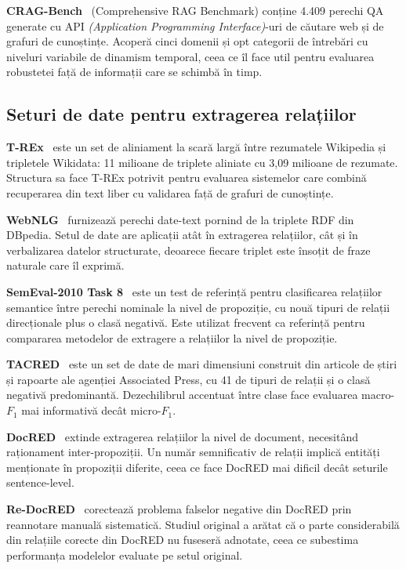 \textbf{CRAG-Bench}~\cite{yang2024cragbench} (Comprehensive RAG Benchmark) conține 4.409 perechi QA generate cu API \textit{(Application Programming Interface)}-uri de căutare web și de grafuri de cunoștințe. Acoperă cinci domenii și opt categorii de întrebări cu niveluri variabile de dinamism temporal, ceea ce îl face util pentru evaluarea robustetei față de informații care se schimbă în timp.

\subsection{Seturi de date pentru extragerea relațiilor}

\textbf{T-REx}~\cite{elsahar2018trex} este un set de aliniament la scară largă între rezumatele Wikipedia și tripletele Wikidata: 11 milioane de triplete aliniate cu 3,09 milioane de rezumate. Structura sa face T-REx potrivit pentru evaluarea sistemelor care combină recuperarea din text liber cu validarea față de grafuri de cunoștințe.

\textbf{WebNLG}~\cite{gardent2017webnlg} furnizează perechi date-text pornind de la triplete RDF din DBpedia. Setul de date are aplicații atât în extragerea relațiilor, cât și în verbalizarea datelor structurate, deoarece fiecare triplet este însoțit de fraze naturale care îl exprimă.

\textbf{SemEval-2010 Task 8}~\cite{hendrickx2010semeval} este un test de referință pentru clasificarea relațiilor semantice între perechi nominale la nivel de propoziție, cu nouă tipuri de relații direcționale plus o clasă negativă. Este utilizat frecvent ca referință pentru compararea metodelor de extragere a relațiilor la nivel de propoziție.

\textbf{TACRED}~\cite{zhang2017tacred} este un set de date de mari dimensiuni construit din articole de știri și rapoarte ale agenției Associated Press, cu 41 de tipuri de relații și o clasă negativă predominantă. Dezechilibrul accentuat între clase face evaluarea macro-$F_1$ mai informativă decât micro-$F_1$.

\textbf{DocRED}~\cite{yao2019docred} extinde extragerea relațiilor la nivel de document, necesitând raționament inter-propoziții. Un număr semnificativ de relații implică entități menționate în propoziții diferite, ceea ce face DocRED mai dificil decât seturile sentence-level.

\textbf{Re-DocRED}~\cite{tan2022redocred} corectează problema falselor negative din DocRED prin reannotare manuală sistematică. Studiul original a arătat că o parte considerabilă din relațiile corecte din DocRED nu fuseseră adnotate, ceea ce subestima performanța modelelor evaluate pe setul original.

